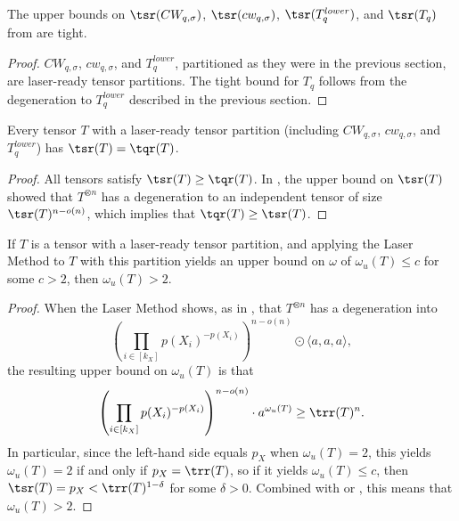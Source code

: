 \documentclass{toc}
\begin{document}
\begin{corollary}
The upper bounds on $\tsr(CW_{q,\sigma})$, $\tsr(cw_{q,\sigma})$, $\tsr(T_q^{lower})$, and $\tsr(T_q)$ from  are tight.
\end{corollary}

\begin{proof}
$CW_{q,\sigma}$, $cw_{q,\sigma}$, and $T_q^{lower}$, partitioned as they were in the previous section, are laser-ready tensor partitions. The tight bound for $T_q$ follows from the degeneration to $T_q^{lower}$ described in the previous section.
\end{proof}

\begin{corollary} \label{subrankcorr}
Every tensor $T$ with a laser-ready tensor partition (including $CW_{q,\sigma}$, $cw_{q,\sigma}$, and $T_q^{lower}$) has $\tsr(T) = \tqr(T)$.
\end{corollary}

\begin{proof}
All tensors satisfy $\tsr(T) \geq \tqr(T)$. In , the upper bound on $\tsr(T)$ showed that $T^{\otimes n}$ has a degeneration to an independent tensor of size $\tsr(T)^{n - o(n)}$, which implies that $\tqr(T) \geq \tsr(T)$.
\end{proof}

\begin{corollary}
If $T$ is a tensor with a laser-ready tensor partition, and applying the Laser Method to $T$ with this partition yields an upper bound on $\omega$ of $\omega_u(T) \leq c$ for some $c>2$, then $\omega_u(T) > 2$.
\end{corollary}

\begin{proof}
When the Laser Method shows, as in , that $T^{\otimes n}$ has a degeneration into $$\left(\prod_{i \in [k_X]} p(X_i)^{-p(X_i)}\right)^{n - o(n)} \odot \langle a,a,a \rangle,$$
the resulting upper bound on $\omega_u(T)$ is that $$\left(\prod_{i \in [k_X]} p(X_i)^{-p(X_i)}\right)^{n - o(n)} \cdot a^{\omega_u(T)} \geq \trr(T)^n.$$
In particular, since the left-hand side equals $p_X$ when $\omega_u(T)=2$, this yields $\omega_u(T)=2$ if and only if $p_X = \trr(T)$, so if it yields $\omega_u(T) \leq c$, then $\tsr(T) = p_X < \trr(T)^{1-\delta}$ for some $\delta>0$. Combined with  or , this means that $\omega_u(T)>2$.
\end{proof}
\end{document}
